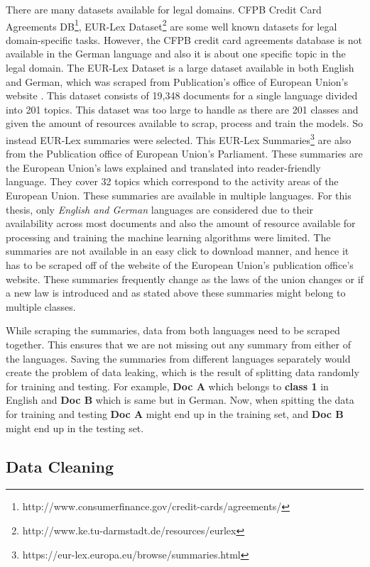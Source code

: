 There are many datasets available for legal domains. CFPB Credit Card Agreements DB\footnote{http://www.consumerfinance.gov/credit-cards/agreements/}, EUR-Lex Dataset\footnote{http://www.ke.tu-darmstadt.de/resources/eurlex} are some well known datasets for legal domain-specific tasks. However, the CFPB credit card agreements database is not available in the German language and also it is about one specific topic in the legal domain. The EUR-Lex Dataset is a large dataset available in both English and German, which was scraped from Publication's office of European Union's website \cite{mencia2010efficient}. This dataset consists of 19,348 documents for a single language divided into 201 topics. This dataset was too large to handle as there are 201 classes and given the amount of resources available to scrap, process and train the models. So instead EUR-Lex summaries were selected. This EUR-Lex Summaries\footnote{https://eur-lex.europa.eu/browse/summaries.html} are also from the Publication office of European Union's Parliament. These summaries are the European Union's laws explained and translated into reader-friendly language. They cover 32 topics which correspond to the activity areas of the European Union. These summaries are available in multiple languages. For this thesis, only \textit{English and German} languages are considered due to their availability across most documents and also the amount of resource available for processing and training the machine learning algorithms were limited. The summaries are not available in an easy click to download manner, and hence it has to be scraped off of the website of the European Union's publication office's website. These summaries frequently change as the laws of the union changes or if a new law is introduced and as stated above these summaries might belong to multiple classes. 

While scraping the summaries, data from both languages need to be scraped together. This ensures that we are not missing out any summary from either of the languages. Saving the summaries from different languages separately would create the problem of data leaking, which is the result of splitting data randomly for training and testing. For example, \textbf{Doc A} which belongs to \textbf{class 1} in English and \textbf{Doc B} which is same but in German. Now, when spitting the data for training and testing \textbf{Doc A} might end up in the training set, and \textbf{Doc B} might end up in the testing set. 

\subsection*{Data Cleaning}\label{ConceptCleaning}


